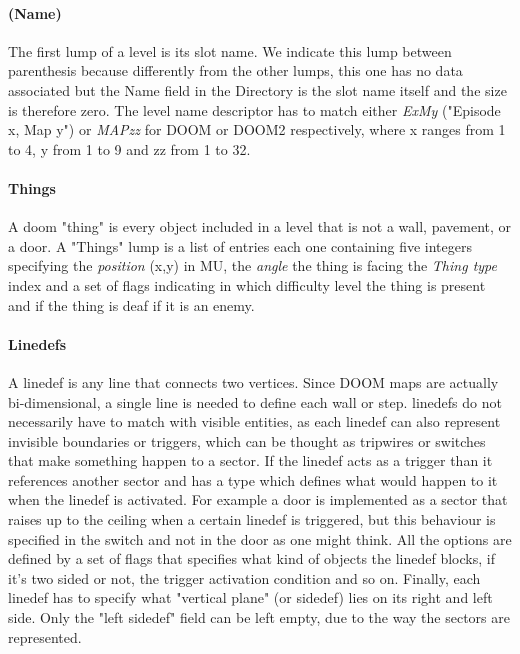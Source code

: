 \paragraph{(Name)} \label{slotname} The first lump of a level is its slot name. We indicate this lump between parenthesis because differently from the other lumps, this one has no data associated but the Name field in the Directory is the slot name itself and the size is therefore zero. The level name descriptor has to match either \textit{ExMy} ("Episode x, Map y") or \textit{MAPzz} for DOOM or DOOM2 respectively, where x ranges from 1 to 4, y from 1 to 9 and zz from 1 to 32.


\paragraph{Things} A doom "\gls{thing}" is every object included in a level that is not a wall, pavement, or a door. A "Things" lump is a list of entries each one containing five integers specifying the \textit{position} (x,y) in \gls{MU}, the \textit{angle} the thing is facing the \textit{Thing type} index and a set of flags indicating in which difficulty level the thing is present and if the thing is deaf if it is an enemy.

\paragraph{Linedefs} A \gls{linedef} is any line that connects two vertices. Since DOOM maps are actually bi-dimensional, a single line is needed to define each wall or step. \glspl{linedef} do not necessarily have to match with visible entities, as each \gls{linedef} can also represent invisible boundaries or triggers, which can be thought as tripwires or switches that make something happen to a sector. If the \gls{linedef} acts as a trigger than it references another sector and has a type which defines what would happen to it when the \gls{linedef} is activated. For example a door is implemented as a sector that raises up to the ceiling when a certain \gls{linedef} is triggered, but this behaviour is specified in the switch and not in the door as one might think. All the options are defined by a set of flags that specifies what kind of objects the \gls{linedef} blocks, if it's two sided or not, the trigger activation condition and so on.
Finally, each \gls{linedef} has to specify what "vertical plane" (or \gls{sidedef}) lies on its right and left side. Only the "left sidedef" field can be left empty, due to the way the sectors are represented.

